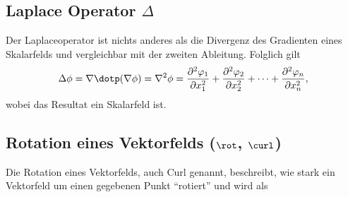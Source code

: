 
\subsection[Laplace Operator Delta]{Laplace Operator $\Delta$}
Der Laplaceoperator ist nichts anderes als die Divergenz des Gradienten eines Skalarfelds und vergleichbar mit der zweiten Ableitung.
Folglich gilt
\[
    \Delta \phi = \nabla \dotp (\nabla \phi) = \nabla^2 \phi = \frac{\partial^2 \varphi_1}{\partial x_1^2} + \frac{\partial^2 \varphi_2}{\partial x_2^2} + \dots + \frac{\partial^2 \varphi_n}{\partial x_n^2},
\]
wobei das Resultat ein Skalarfeld ist.

\subsection[Rotation eines Vektorfelds (rot, curl)]{Rotation eines Vektorfelds ($\rot$, $\curl$)}
Die Rotation eines Vektorfelds, auch Curl genannt, beschreibt, wie stark ein Vektorfeld um einen gegebenen Punkt ``rotiert'' und wird als

